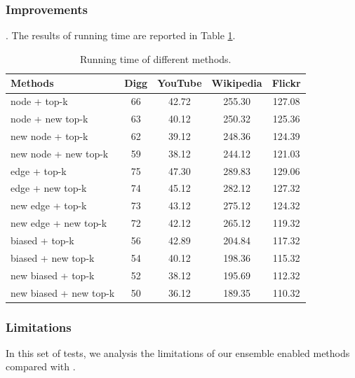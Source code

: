 {\subsubsection{Improvements}
. The results of running time are reported in Table \ref{tab_improvements}. \\
\begin{table}
\caption{Running time of different methods.}
\label{tab_improvements}
\vspace{-2ex}
\centering
\newcommand{\tabincell}[2]{\begin{tabular}{@{}#1@{}}#2\end{tabular}}
\begin{tabular}{l|c|c|c|c}
\hline \hline Methods & Digg & YouTube & Wikipedia & Flickr \\
\hline \hline
node + top-k            & 66    & 42.72 & 255.30 & 127.08 \\
node + new top-k        & 63    & 40.12 & 250.32 & 125.36 \\
new node + top-k        & 62    & 39.12 & 248.36 & 124.39 \\
new node + new top-k    & 59    & 38.12 & 244.12 & 121.03 \\
\hline
edge + top-k            & 75    & 47.30 & 289.83 & 129.06 \\
edge + new top-k        & 74    & 45.12 & 282.12 & 127.32 \\
new edge + top-k        & 73    & 43.12 & 275.12 & 124.32 \\
new edge + new top-k    & 72    & 42.12 & 265.12 & 119.32 \\
\hline
biased + top-k          & 56    & 42.89 & 204.84 & 117.32 \\
biased + new top-k      & 54    & 40.12 & 198.36 & 115.32 \\
new biased + top-k      & 52    & 38.12 & 195.69 & 112.32 \\
new biased + new top-k  & 50    & 36.12 & 189.35 & 110.32 \\
\hline \hline
\end{tabular}
\end{table}
\subsubsection{Limitations}
In this set of tests, we analysis the limitations of our ensemble enabled methods compared with \NMF.
}


